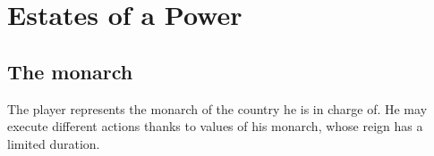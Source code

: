 \section{Estates of a Power}










\subsection{The monarch}

\aparag The player represents the monarch of the country he is in charge
of. He may execute different actions thanks to values of his monarch, whose
reign has a limited duration.

